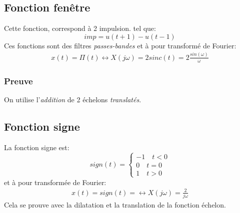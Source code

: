 \documentclass{report}
\begin{document}
\subsection{Fonction fenêtre} \label{window}
Cette fonction, correspond à 2 impulsion. tel que:
\begin{equation}
imp = u(t+1) - u(t-1)
\end{equation}
Ces fonctions sont des filtres \textit{passes-bandes} et à pour transformé de Fourier:
\begin{align*}
x(t) = \Pi (t) \longleftrightarrow X(j\omega) = 2 sinc(t) = 2\frac{sin(\omega)}{\omega}
\end{align*}

\subsubsection{Preuve}
On utilise l'\textit{addition} de 2 échelons \textit{translatés}.

\subsection{Fonction signe}
La fonction signe est:
\begin{equation}
sign(t) = \begin{cases}
-1 \quad t < 0\\
0 \quad t = 0\\
1 \quad t > 0
\end{cases}
\end{equation}
et à pour transformée de Fourier:
\begin{align*}
x(t) = sign(t) = \longleftrightarrow X(j\omega) = \frac{2}{j\omega}
\end{align*}
Cela se prouve avec la dilatation et la translation de la fonction échelon.
\end{document}
